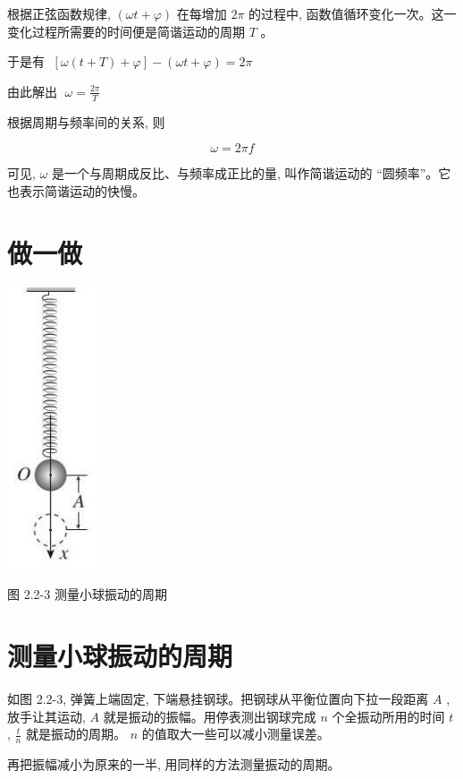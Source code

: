 \documentclass[10pt]{article}
\begin{document}
根据正弦函数规律, \(\left( {{\omega t} + \varphi }\right)\) 在每增加 \({2\pi }\) 的过程中, 函数值循环变化一次。这一变化过程所需要的时间便是简谐运动的周期 \(T\) 。

于是有 \(\;\left\lbrack {\omega \left( {t + T}\right) + \varphi }\right\rbrack - \left( {{\omega t} + \varphi }\right) = {2\pi }\)

由此解出 \(\;\omega = \frac{2\pi }{T}\)

根据周期与频率间的关系, 则

\[
\omega = {2\pi f}
\]

可见, \(\omega\) 是一个与周期成反比、与频率成正比的量, 叫作简谐运动的 “圆频率”。它也表示简谐运动的快慢。

\section*{做一做}

\begin{center}
\includegraphics[max width=0.2\textwidth]{images/01910e4c-ebb8-7d2c-8f2f-2375bc1d2d12_42_870812.jpg}
\end{center}

图 2.2-3 测量小球振动的周期

\section*{测量小球振动的周期}

如图 2.2-3, 弹簧上端固定, 下端悬挂钢球。把钢球从平衡位置向下拉一段距离 \(A\) ,放手让其运动, \(A\) 就是振动的振幅。用停表测出钢球完成 \(n\) 个全振动所用的时间 \(t\) , \(\frac{t}{n}\) 就是振动的周期。 \(n\) 的值取大一些可以减小测量误差。

再把振幅减小为原来的一半, 用同样的方法测量振动的周期。
\end{document}
